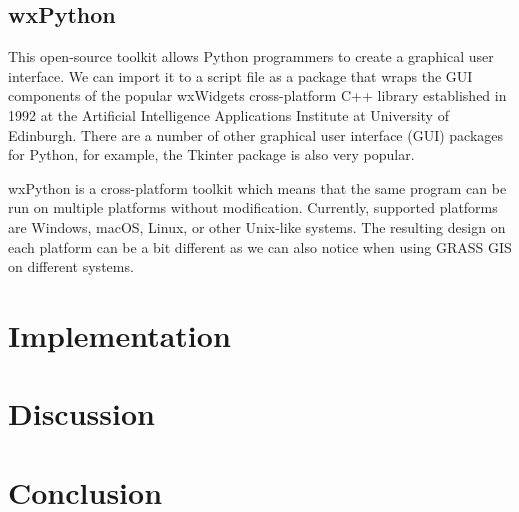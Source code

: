 \documentclass[a4paper,10pt,twoside]{article}
\begin{document}
\subsection{wxPython}
\noindent
\large

\noindent This open-source toolkit allows Python programmers to create a graphical user interface. We can import it to a script file as a package that wraps the GUI components of the popular wxWidgets cross-platform C++ library established in 1992 at the Artificial Intelligence Applications Institute at University of Edinburgh. There are a number of other graphical user interface (GUI) packages for Python, for example, the Tkinter package is also very popular.

wxPython is a cross-platform toolkit which means that the same program can be run on multiple platforms without modification. Currently, supported platforms are Windows, macOS, Linux, or other Unix-like systems. The resulting design on each platform can be a bit different as we can also notice when using GRASS GIS on different systems. 


\newpage
\vspace*{-1cm}
\section{Implementation}
\noindent
\large

\newpage
\vspace*{-1cm}
\section*{Discussion}
\noindent
\large

\newpage
\vspace*{-1cm}
\section*{Conclusion}
\noindent
\large
\end{document}
